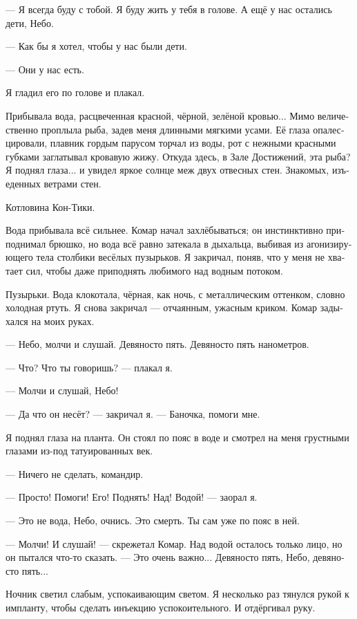 \documentclass[a4paper,12pt,fleqn]{book}\usepackage{cooltooltips}\usepackage{polyglossia}\setdefaultlanguage[babelshorthands=true]{russian}\setotherlanguage{english}\defaultfontfeatures{Ligatures=TeX,Mapping=tex-text} \usepackage{xcolor}\definecolor{lightgray}{HTML}{bbbbbb}\color{lightgray}\newcommand{\ml}[3]{\textenglish{\textcolor{black}{#3}}}
\newcommand{\asterism}{\vspace{1em}{\centering\Large\bfseries$\ast~\ast~\ast$\par}\vspace{1em}}
\begin{document}
{--- Я всегда буду с тобой.
Я буду жить у тебя в голове.
А ещё у нас остались дети, Небо.

--- Как бы я хотел, чтобы у нас были дети.

--- Они у нас есть.

Я гладил его по голове и плакал.

Прибывала вода, расцвеченная красной, чёрной, зелёной кровью...
Мимо величественно проплыла рыба, задев меня длинными мягкими усами.
Её глаза опалесцировали, плавник гордым парусом торчал из воды, рот с нежными красными губками заглатывал кровавую жижу.
Откуда здесь, в Зале Достижений, эта рыба?
Я поднял глаза... и увидел яркое солнце меж двух отвесных стен.
Знакомых, изъеденных ветрами стен.

Котловина Кон-Тики.

Вода прибывала всё сильнее.
Комар начал захлёбываться;
он инстинктивно приподнимал брюшко, но вода всё равно затекала в дыхальца, выбивая из агонизирующего тела столбики весёлых пузырьков.
Я закричал, поняв, что у меня не хватает сил, чтобы даже приподнять любимого над водным потоком.

Пузырьки.
Вода клокотала, чёрная, как ночь, с металлическим оттенком, словно холодная ртуть.
Я снова закричал --- отчаянным, ужасным криком.
Комар задыхался на моих руках.

--- Небо, молчи и слушай.
Девяносто пять.
Девяносто пять нанометров.

--- Что?
Что ты говоришь? --- плакал я.

--- Молчи и слушай, Небо!

--- Да что он несёт? --- закричал я.
--- Баночка, помоги мне.

Я поднял глаза на планта.
Он стоял по пояс в воде и смотрел на меня грустными глазами из-под татуированных век.

--- Ничего не сделать, командир.

--- Просто! Помоги! Его! Поднять! Над! Водой! --- заорал я.

--- Это не вода, Небо, очнись.
Это смерть.
Ты сам уже по пояс в ней.

--- Молчи! И слушай! --- скрежетал Комар.
Над водой осталось только лицо, но он пытался что-то сказать.
--- Это очень важно...
Девяносто пять, Небо, девяносто пять...

\asterism

Ночник светил слабым, успокаивающим светом.
Я несколько раз тянулся рукой к импланту, чтобы сделать инъекцию успокоительного.
И отдёргивал руку.

}
\end{document}
